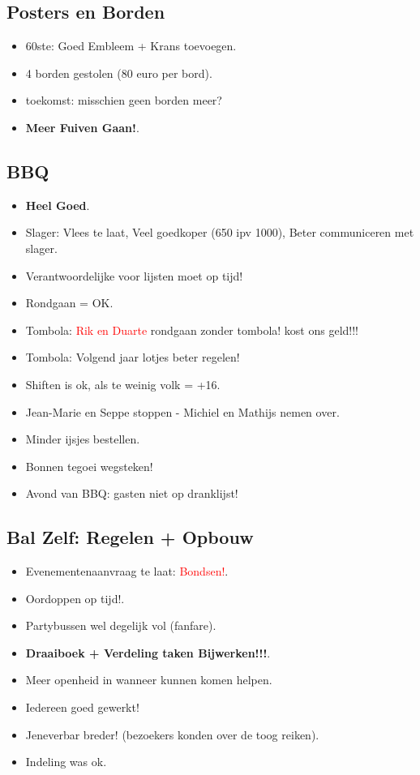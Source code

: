 \documentclass[pdftex,12pt,a4paper,english,titlepage]{article}
\begin{document}
\subsection{Posters en Borden}
\begin{itemize}
	\item 60ste: Goed Embleem + Krans toevoegen.
	\item 4 borden gestolen (80 euro per bord).
	\item toekomst: misschien geen borden meer?
	\item \textbf{Meer Fuiven Gaan!}.
\end{itemize}

\subsection{BBQ}
\begin{itemize}
	\item \textbf{Heel Goed}.
	\item Slager: Vlees te laat, Veel goedkoper (650 ipv 1000), Beter communiceren met slager.
	\item Verantwoordelijke voor lijsten moet op tijd!
	\item Rondgaan = OK.
	\item Tombola: \textcolor{red}{Rik en Duarte} rondgaan zonder tombola! kost ons geld!!!
	\item Tombola: Volgend jaar lotjes beter regelen!
	\item Shiften is ok, als te weinig volk = +16.
	\item Jean-Marie en Seppe stoppen - Michiel en Mathijs nemen over.
	\item Minder ijsjes bestellen.
	\item Bonnen tegoei wegsteken!
	\item Avond van BBQ: gasten niet op dranklijst!
\end{itemize}

\subsection{Bal Zelf: Regelen + Opbouw}
\begin{itemize}
	\item Evenementenaanvraag te laat: \textcolor{red}{Bondsen!}.
	\item Oordoppen op tijd!.
	\item Partybussen wel degelijk vol (fanfare).
	\item \textbf{Draaiboek + Verdeling taken Bijwerken!!!}.
	\item Meer openheid in wanneer kunnen komen helpen.
	\item Iedereen goed gewerkt!
	\item Jeneverbar breder! (bezoekers konden over de toog reiken).
	\item Indeling was ok.
\end{itemize}
\end{document}
